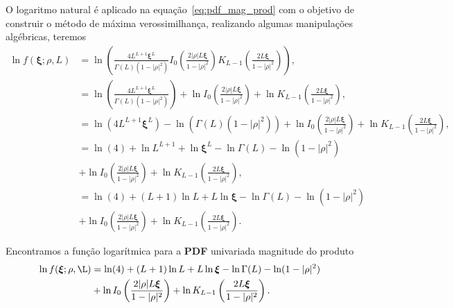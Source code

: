 O logaritmo natural é aplicado na equação~\eqref{eq:pdf_mag_prod} com o objetivo de construir o método de máxima verossimilhança, realizando algumas manipulações algébricas, teremos
\begin{equation}\nonumber
\begin{split}
	\ln f(\bm\xi;\rho,L)&=\ln\left(\frac{4L^{L+1}\bm\xi^L}{\Gamma(L)(1-|\rho|^2)}I_0\left(\frac{2|\rho|L\bm\xi}{1-|\rho|^2}\right)K_{L-1}\left(\frac{2L\bm\xi}{1-|\rho|^2}\right)\right),\\
	&=\ln\left(\frac{4L^{L+1}\bm\xi^L}{\Gamma(L)(1-|\rho|^2)}\right)+\ln I_0\left(\frac{2|\rho|L\bm\xi}{1-|\rho|^2}\right)+ \ln K_{L-1}\left(\frac{2L\bm\xi}{1-|\rho|^2}\right),\\
	&=\ln (4L^{L+1}\bm\xi^L)-\ln(\Gamma(L)(1-|\rho|^2))+\ln I_0\left(\frac{2|\rho|L\bm\xi}{1-|\rho|^2}\right)+ \ln K_{L-1}\left(\frac{2L\bm\xi}{1-|\rho|^2}\right),\\
     &=\ln (4)+\ln L^{L+1}+\ln \bm\xi^L-\ln\Gamma(L)-\ln(1-|\rho|^2)\\
     &+\ln I_0\left(\frac{2|\rho|L\bm\xi}{1-|\rho|^2}\right)+ \ln K_{L-1}\left(\frac{2L\bm\xi}{1-|\rho|^2}\right),\\
	&=\ln (4)+(L+1)\ln L+L\ln \bm\xi-\ln\Gamma(L)-\ln(1-|\rho|^2)\\
	&+\ln I_0\left(\frac{2|\rho|L\bm\xi}{1-|\rho|^2}\right)+ \ln K_{L-1}\left(\frac{2L\bm\xi}{1-|\rho|^2}\right).
		\end{split}
\end{equation}

Encontramos a função logarítmica para a \textbf{PDF} univariada magnitude do produto
\begin{equation}\label{eq:log_vero_mag_produto}
\begin{split}
	\ln f(\bm\xi; \rho,\L)&=\ln (4)+(L+1)\ln L+L\ln \bm\xi-\ln\Gamma(L)-\ln(1-|\rho|^2)\\
	                      &+\ln I_0\left(\frac{2|\rho|L\bm\xi}{1-|\rho|^2}\right)+ \ln K_{L-1}\left(\frac{2L\bm\xi}{1-|\rho|^2}\right).
	\end{split}
\end{equation}

